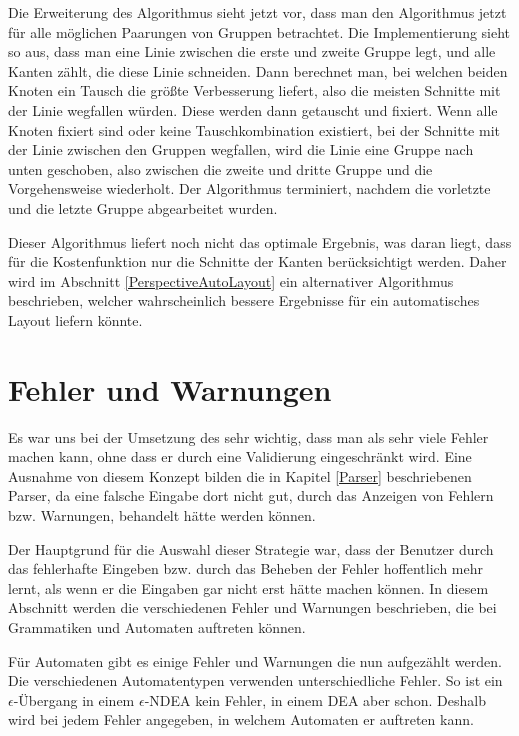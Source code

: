 Die Erweiterung des Algorithmus sieht jetzt vor, dass man den Algorithmus jetzt
für alle möglichen Paarungen von Gruppen betrachtet. Die Implementierung
sieht so aus, dass man eine Linie zwischen die erste und zweite Gruppe legt, und
alle Kanten zählt, die diese Linie schneiden. Dann berechnet man, bei
welchen beiden Knoten ein Tausch die größte Verbesserung liefert, also die
meisten Schnitte mit der Linie wegfallen würden. Diese werden dann getauscht und
fixiert. Wenn alle Knoten fixiert sind oder keine Tauschkombination existiert,
bei der Schnitte mit der Linie zwischen den Gruppen wegfallen, wird die Linie
eine Gruppe nach unten geschoben, also zwischen die zweite und dritte Gruppe und
die Vorgehensweise wiederholt. Der Algorithmus terminiert, nachdem die vorletzte
und die letzte Gruppe abgearbeitet wurden.\vspace{10pt}

Dieser Algorithmus liefert noch nicht das optimale Ergebnis, was daran liegt,
dass für die Kostenfunktion nur die Schnitte der Kanten berücksichtigt werden.
Daher wird im Abschnitt \ref{PerspectiveAutoLayout} ein alternativer Algorithmus
beschrieben, welcher wahrscheinlich bessere Ergebnisse für ein automatisches
Layout liefern könnte.\vspace{10pt}


\section{Fehler und Warnungen}\label{InteractionMachine}

Es war uns bei der Umsetzung des \gtitools sehr wichtig, dass man als sehr viele
Fehler machen kann, ohne dass er durch eine Validierung eingeschränkt wird. Eine
Ausnahme von diesem Konzept bilden die in Kapitel \ref{Parser} beschriebenen
Parser, da eine falsche Eingabe dort nicht gut, durch das Anzeigen von Fehlern
bzw. Warnungen, behandelt hätte werden können.\vspace{10pt}

Der Hauptgrund für die Auswahl dieser Strategie war, dass der Benutzer durch das
fehlerhafte Eingeben bzw. durch das Beheben der Fehler hoffentlich mehr lernt,
als wenn er die Eingaben gar nicht erst hätte machen können. In diesem Abschnitt
werden die verschiedenen Fehler und Warnungen beschrieben, die bei Grammatiken und
Automaten auftreten können.\vspace{10pt}

Für Automaten gibt es einige Fehler und Warnungen die nun aufgezählt werden. Die
verschiedenen Automatentypen verwenden unterschiedliche Fehler. So ist ein
$\epsilon$-Übergang in einem $\epsilon$-NDEA kein Fehler, in einem DEA aber
schon. Deshalb wird bei jedem Fehler angegeben, in welchem Automaten er auftreten
kann.\vspace{10pt}

